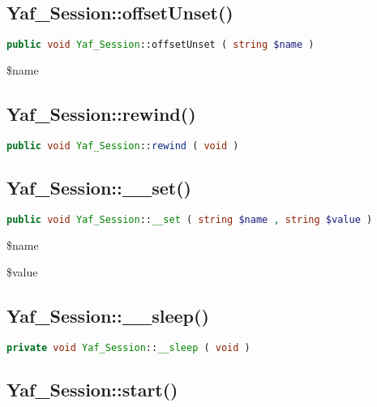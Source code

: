 \subsection{Yaf\_Session::offsetUnset()}





\begin{lstlisting}[language=PHP]
public void Yaf_Session::offsetUnset ( string $name )
\end{lstlisting}

\begin{compactitem}
\item \$name
\end{compactitem}


\subsection{Yaf\_Session::rewind()}


\begin{lstlisting}[language=PHP]
public void Yaf_Session::rewind ( void )
\end{lstlisting}

\subsection{Yaf\_Session::\_\_set()}

\begin{lstlisting}[language=PHP]
public void Yaf_Session::__set ( string $name , string $value )
\end{lstlisting}

\begin{compactitem}
\item \$name
\item \$value
\end{compactitem}


\subsection{Yaf\_Session::\_\_sleep()}



\begin{lstlisting}[language=PHP]
private void Yaf_Session::__sleep ( void )
\end{lstlisting}


\subsection{Yaf\_Session::start()}


